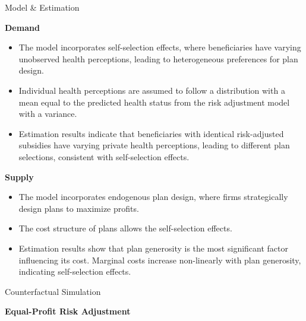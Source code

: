 \documentclass{beamer}
\begin{document}
\begin{frame}[t]
\begin{columns}[t]
    \begin{column}{.45\textwidth}

            \begin{block}{Model \& Estimation}
              \begin{center}
              \textbf{Demand}
              \end{center}
              \begin{itemize}
                \item The model incorporates self-selection effects, where beneficiaries have varying unobserved health perceptions, leading to heterogeneous preferences for plan design.
                \item Individual health perceptions are assumed to follow a distribution with a mean equal to the predicted health status from the risk adjustment model with a variance.
                \item Estimation results indicate that beneficiaries with identical risk-adjusted subsidies have varying private health perceptions, leading to different plan selections, consistent with self-selection effects.     
              \end{itemize}
            
            \begin{center}
              \textbf{Supply}
            \end{center}
        
            \begin{itemize}
              \item The model incorporates endogenous plan design, where firms strategically design plans to maximize profits.
              \item The cost structure of plans allows the self-selection effects.
              \item Estimation results show that plan generosity is the most significant factor influencing its cost. Marginal costs increase non-linearly with plan generosity, indicating self-selection effects.
            \end{itemize}
              \end{block}

      \begin{block}{Counterfactual Simulation}
        \begin{center}
          \textbf{Equal-Profit Risk Adjustment}
        \end{center}


\end{block}
\end{column}
\end{columns}
\end{frame}
\end{document}
